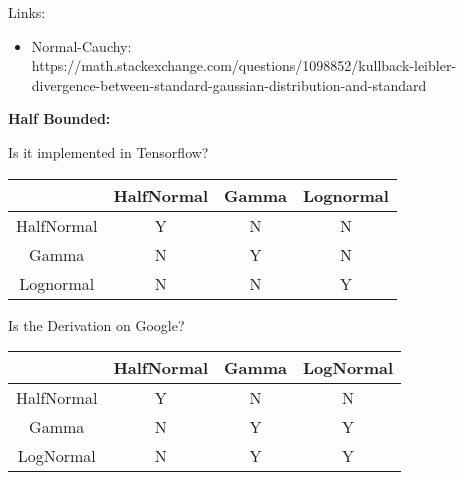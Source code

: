 \documentclass{article}
\begin{document}
Links:
\begin{itemize}
    \item Normal-Cauchy: https://math.stackexchange.com/questions/1098852/kullback-leibler-divergence-between-standard-gaussian-distribution-and-standard
\end{itemize}


\textbf{Half Bounded:}

Is it implemented in Tensorflow?

\begin{center}
\begin{tabular}{ c | c c c }
 & HalfNormal & Gamma & Lognormal \\
 \hline
 HalfNormal & Y & N & N \\ 
 Gamma & N & Y & N \\  
 Lognormal & N & N & Y    
\end{tabular}
\end{center}

Is the Derivation on Google?

\begin{center}
\begin{tabular}{ c | c c c }
 & HalfNormal & Gamma & LogNormal \\
 \hline
 HalfNormal & Y & N & N \\ 
 Gamma & N & Y & Y \\  
 LogNormal & N & Y & Y   
\end{tabular}
\end{center}
\end{document}
